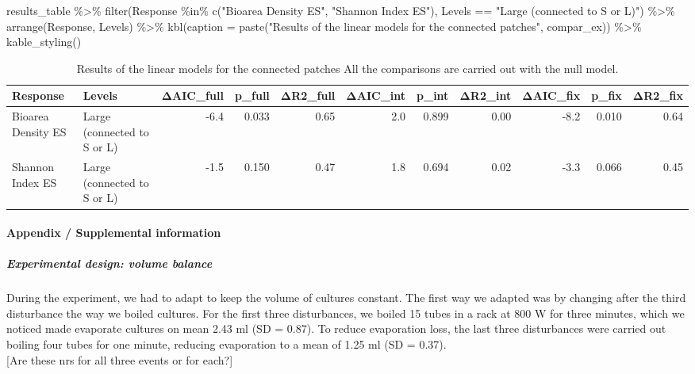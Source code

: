 \documentclass[
]{article}
\newenvironment{Shaded}{\begin{snugshade}}{\end{snugshade}}
\newcommand{\AttributeTok}[1]{\textcolor[rgb]{0.77,0.63,0.00}{#1}}
\newcommand{\FunctionTok}[1]{\textcolor[rgb]{0.00,0.00,0.00}{#1}}
\newcommand{\NormalTok}[1]{#1}
\newcommand{\SpecialCharTok}[1]{\textcolor[rgb]{0.00,0.00,0.00}{#1}}
\newcommand{\StringTok}[1]{\textcolor[rgb]{0.31,0.60,0.02}{#1}}
\begin{document}
\begin{Shaded}
\begin{Highlighting}[]
\NormalTok{results\_table }\SpecialCharTok{\%\textgreater{}\%}
  \FunctionTok{filter}\NormalTok{(Response }\SpecialCharTok{\%in\%} \FunctionTok{c}\NormalTok{(}\StringTok{"Bioarea Density ES"}\NormalTok{, }
                         \StringTok{"Shannon Index ES"}\NormalTok{),}
\NormalTok{         Levels }\SpecialCharTok{==} \StringTok{"Large (connected to S or L)"}\NormalTok{) }\SpecialCharTok{\%\textgreater{}\%}
  \FunctionTok{arrange}\NormalTok{(Response, Levels) }\SpecialCharTok{\%\textgreater{}\%}
  \FunctionTok{kbl}\NormalTok{(}\AttributeTok{caption =} \FunctionTok{paste}\NormalTok{(}\StringTok{"Results of the linear models for the connected patches"}\NormalTok{, compar\_ex)) }\SpecialCharTok{\%\textgreater{}\%}
  \FunctionTok{kable\_styling}\NormalTok{()}
\end{Highlighting}
\end{Shaded}

\begin{table}

\caption{\label{tab:fig-connected-patches}Results of the linear models for the connected patches All the comparisons are carried out with the null model.}
\centering
\begin{tabular}[t]{l|l|r|r|r|r|r|r|r|r|r}
\hline
Response & Levels & ΔAIC\_full & p\_full & ΔR2\_full & ΔAIC\_int & p\_int & ΔR2\_int & ΔAIC\_fix & p\_fix & ΔR2\_fix\\
\hline
Bioarea Density ES & Large (connected to S or L) & -6.4 & 0.033 & 0.65 & 2.0 & 0.899 & 0.00 & -8.2 & 0.010 & 0.64\\
\hline
Shannon Index ES & Large (connected to S or L) & -1.5 & 0.150 & 0.47 & 1.8 & 0.694 & 0.02 & -3.3 & 0.066 & 0.45\\
\hline
\end{tabular}
\end{table}

\hypertarget{appendix-supplemental-information}{%
\paragraph{Appendix / Supplemental
information}\label{appendix-supplemental-information}}

\hypertarget{experimental-design-volume-balance}{%
\subparagraph{Experimental design: volume
balance}\label{experimental-design-volume-balance}}

During the experiment, we had to adapt to keep the volume of cultures
constant. The first way we adapted was by changing after the third
disturbance the way we boiled cultures. For the first three
disturbances, we boiled 15 tubes in a rack at 800 W for three minutes,
which we noticed made evaporate cultures on mean 2.43 ml (SD = 0.87). To
reduce evaporation loss, the last three disturbances were carried out
boiling four tubes for one minute, reducing evaporation to a mean of
1.25 ml (SD = 0.37).\\
{[}Are these nrs for all three events or for each?{]}
\end{document}
